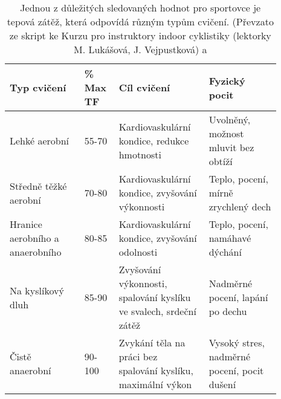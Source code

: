 \begin{table}[h]
    \centering
    \begin{tabular}{p{0.25\linewidth} | p{0.1\linewidth} | p{0.30\linewidth} | p{0.24\linewidth}}
        \textbf{Typ cvičení}            & \textbf{\% Max TF} & \textbf{Cíl cvičení}                                              & \textbf{Fyzický pocit}              \\ \hline
        Lehké aerobní                   & 55-70                    & Kardiovaskulární kondice, redukce hmotnosti                       & Uvolněný, možnost mluvit bez obtíží \\
        Středně těžké aerobní           & 70-80                    & Kardiovaskulární kondice, zvyšování výkonnosti                    & Teplo, pocení, mírně zrychlený dech \\
        Hranice aerobního a anaerobního & 80-85                    & Kardiovaskulární kondice, zvyšování odolnosti                     & Teplo, pocení, namáhavé dýchání     \\
        Na kyslíkový dluh               & 85-90                    & Zvyšování výkonnosti, spalování kyslíku ve svalech, srdeční zátěž & Nadměrné pocení, lapání po dechu    \\
        Čistě anaerobní                 & 90-100                   & Zvykání těla na práci bez spalování kyslíku, maximální výkon      & Vysoký stres, nadměrné pocení, pocit dušení
    \end{tabular}
    \caption[Typy cvičení podle maximální tepové frekvence]{Jednou z důležitých sledovaných hodnot pro sportovce je tepová zátěž, která odpovídá různým typům cvičení. (Převzato ze skript ke Kurzu pro instruktory indoor cyklistiky (lektorky M. Lukášová, J. Vejpustková) a \cite{tep}}
    \label{tab:MTF}
\end{table}
